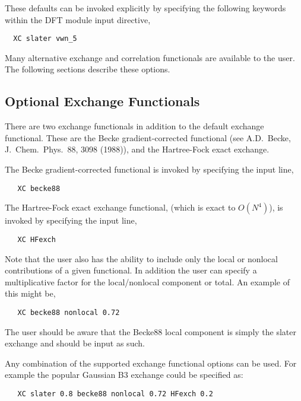 These defaults can be invoked explicitly by specifying the following
keywords within the DFT module input directive,

\begin{verbatim}
  XC slater vwn_5
\end{verbatim}

Many alternative exchange and correlation functionals are available to
the user.  The following sections describe these options.

\subsection{Optional Exchange Functionals}

There are two exchange functionals in addition to the default exchange
functional.  These are the Becke gradient-corrected functional (see A.D.~Becke, 
J.~Chem.~Phys.~88, 3098 (1988)), and the Hartree-Fock exact exchange.

The Becke gradient-corrected functional is invoked by specifying the input
line,

\begin{verbatim}
   XC becke88
\end{verbatim}

The Hartree-Fock exact exchange functional, (which is exact to $O(N^4)$),
is invoked by specifying the input line,

\begin{verbatim}
   XC HFexch
\end{verbatim}

Note that the user also has the ability to include only the local or
nonlocal contributions of a given functional.  In addition the user
can specify a multiplicative factor for the local/nonlocal component
or total.  An example of this might be,

\begin{verbatim}
   XC becke88 nonlocal 0.72
\end{verbatim}

The user should be aware that the Becke88 local component is simply
the slater exchange and should be input as such.

Any combination of the supported exchange functional options can be
used.  For example the popular Gaussian B3 exchange could be specified
as:

\begin{verbatim}
   XC slater 0.8 becke88 nonlocal 0.72 HFexch 0.2
\end{verbatim}

